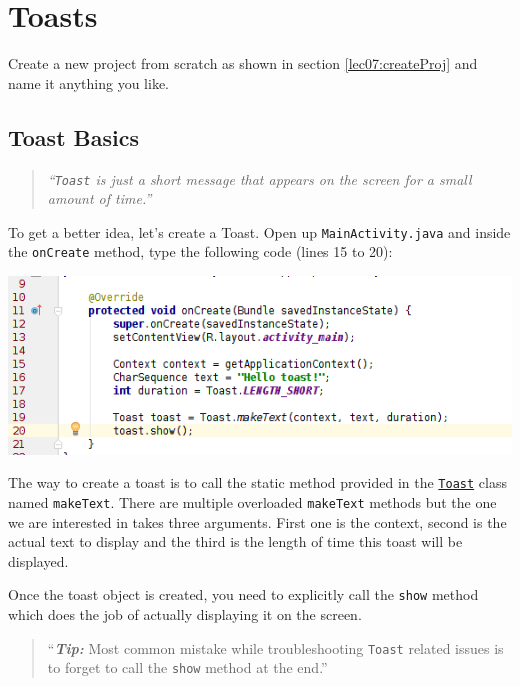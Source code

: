 	\section{Toasts}
	Create a new project from scratch as shown in section \ref{lec07:createProj} and name it anything you like.
	
\subsection{Toast Basics}
\label{lec07:toastBasics}
\begin{quote}
	\textit{``\texttt{Toast} is just a short message that appears on the screen for a small amount of time.''}
\end{quote}

To get a better idea, let's create a Toast. Open up \texttt{MainActivity.java} and inside the \texttt{onCreate} method, type the following code (lines 15 to 20):

\begin{center}
	\includegraphics[scale=0.4]{chapters/ch06/images/13}
\end{center}

The way to create a toast is to call the static method provided in the \href{https://developer.android.com/reference/android/widget/Toast.html}{\texttt{Toast}} class named \texttt{makeText}. There are multiple overloaded \texttt{makeText} methods but the one we are interested in takes three arguments. First one is the context, second is the actual text to display and the third is the length of time this toast will be displayed. 

Once the toast object is created, you need to explicitly call the \texttt{show} method which does the job of actually displaying it on the screen.

\begin{quote}
	``\textit{\textbf{Tip:}} Most common mistake while troubleshooting \texttt{Toast} related issues is to forget to call the \texttt{show} method at the end.''
\end{quote}

